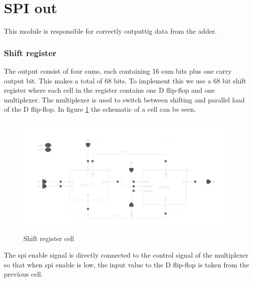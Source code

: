 
 \newpage
\section{SPI out}
This module is responsible for correctly outputtig data from the adder.


\subsubsection{Shift register}
The output consist of four sums, each containing 16 sum bits plus one carry output bit. This makes a total of 68 bits. To implement this we use a 68 bit shift register where each cell in the register contains one D flip-flop and one multiplexer. The multiplexer is used to switch between shifting and parallel load of the D flip-flop. In figure \ref{mux_dff} the schematic of a cell can be seen. 

\begin{figure}[H]
\centering
\captionsetup{justification=centering}
\includegraphics[scale=0.2]{../figures/mux_dffsr.png}
\caption{Shift register cell}
\label{mux_dff}
\end{figure}

\raggedright The spi enable signal is directly connected to the control signal of the multiplexer so that when spi enable is low, the input value to the D flip-flop is taken from the previous cell. 
 


\newpage

